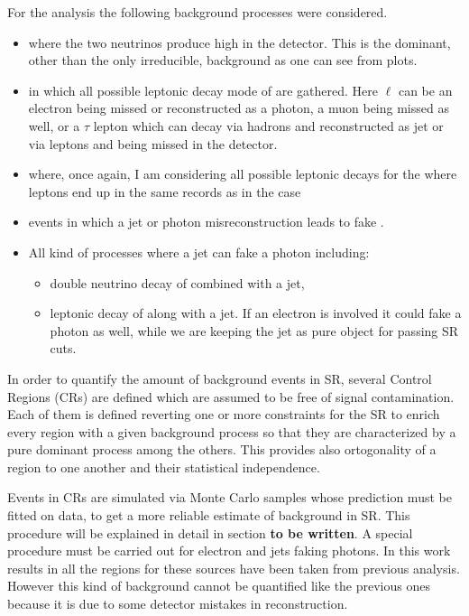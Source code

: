 For the \mph analysis the following background processes were considered.
\begin{itemize}
\item \znng where the two neutrinos produce high \met in the detector. This is the dominant, other than the only irreducible, background as one can see from plots.
\item \wg in which all possible leptonic decay mode of \Wboson are gathered. Here $\ell$ can be an electron being missed or reconstructed as a photon, a muon being missed as well, or a $\tau$ lepton which can decay via hadrons and reconstructed as jet or via leptons and being missed in the detector.
\item \zg where, once again, I am considering all possible leptonic decays for the \Zboson where leptons end up in the same records as in the \Wboson case
\item \gj events in which a jet or photon misreconstruction leads to fake \met.
\item All kind of processes where a jet can fake a photon including:
  \begin{itemize}
  \item double neutrino decay of \Zboson combined with a jet,
  \item leptonic decay of \Wboson along with a jet. If an electron is involved it could fake a photon as well, while we are keeping the jet as pure object for passing SR cuts.
  \end{itemize}
\end{itemize}

In order to quantify the amount of background events in SR, several Control Regions (CRs) are defined which are assumed to be free of signal contamination. Each of them is defined reverting one or more constraints for the SR to enrich every region with a given background process so that they are characterized by a pure dominant process among the others. This provides also ortogonality of a region to one another and their statistical independence.

Events in CRs are simulated via Monte Carlo samples whose prediction must be fitted on data, to get a more reliable estimate of background in SR. This procedure will be explained in detail in section {\bfseries to be written}. A special procedure must be carried out for electron and jets faking photons. In this work results in all the regions for these sources have been taken from previous analysis. However this kind of background cannot be quantified like the previous ones because it is due to some detector mistakes in reconstruction.


